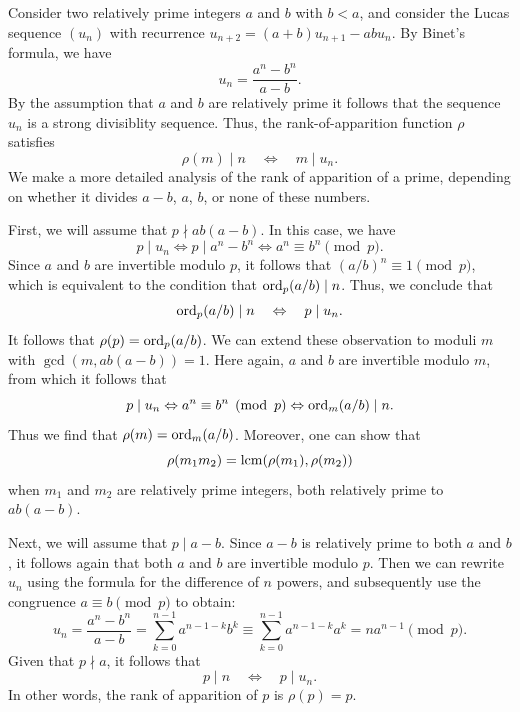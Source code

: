 \begin{example}\label{example:rank-of-apparition-square-discriminant-lucas-sequence}
  Consider two relatively prime integers $a$ and $b$ with $b<a$, and consider the Lucas sequence $(u_n)$ with recurrence $u_{n+2}=(a+b)u_{n+1}-abu_n$. By Binet's formula, we have
  \begin{equation*}
    u_n=\frac{a^n-b^n}{a-b}.
  \end{equation*}
  By the assumption that $a$ and $b$ are relatively prime it follows that the sequence $u_n$ is a strong divisiblity sequence. Thus, the rank-of-apparition function $\rho$ satisfies
  \begin{equation*}
    \rho(m)\mid n\quad\Leftrightarrow\quad m\mid u_n.
  \end{equation*}
  We make a more detailed analysis of the rank of apparition of a prime, depending on whether it divides $a-b$, $a$, $b$, or none of these numbers.

  First, we will assume that $p\nmid ab(a-b)$. In this case, we have
  \begin{equation*}
    p\mid u_n\Leftrightarrow p\mid a^n-b^n\Leftrightarrow a^n\equiv b^n\pmod{p}.
  \end{equation*}
  Since $a$ and $b$ are invertible modulo $p$, it follows that $(a/b)^n\equiv 1\pmod{p}$, which is equivalent to the condition that $\operatorname{ord}_p(a/b)\mid n$. Thus, we conclude that
  \begin{equation*}
    \operatorname{ord}_p(a/b)\mid n \quad\Leftrightarrow\quad p\mid u_n.
  \end{equation*}
  It follows that $\rho(p)=\operatorname{ord}_p(a/b)$. We can extend these observation to moduli $m$ with $\gcd(m,ab(a-b))=1$. Here again, $a$ and $b$ are invertible modulo $m$, from which it follows that
  \begin{equation*}
    p\mid u_n\Leftrightarrow a^n\equiv b^n\mkern5mu\left(\operatorname{mod} \mkern 6mu p\right)\Leftrightarrow \operatorname{ord}_m(a/b)\mid n.
  \end{equation*}
  Thus we find that $\rho(m)=\operatorname{ord}_m(a/b)$. Moreover, one can show that
  \begin{equation*}
    \rho(m_1m_2)=\operatorname*{lcm}(\rho(m_1),\rho(m_2))
  \end{equation*}
  when $m_1$ and $m_2$ are relatively prime integers, both relatively prime to $ab(a-b)$.

  Next, we will assume that $p\mid a-b$. Since $a-b$ is relatively prime to both $a$ and $b$, it follows again that both $a$ and $b$ are invertible modulo $p$. Then we can rewrite $u_n$ using the formula for the difference of $n$\supth{} powers, and subsequently use the congruence $a\equiv b\pmod{p}$ to obtain:
  \begin{equation*}
    u_n=\frac{a^n-b^n}{a-b}=\sum_{k=0}^{n-1} a^{n-1-k}b^k \equiv \sum_{k=0}^{n-1} a^{n-1-k}a^k = na^{n-1}\pmod{p}.
  \end{equation*}
  Given that $p\nmid a$, it follows that
  \begin{equation*}
    p\mid n\quad\Leftrightarrow\quad p\mid u_n.
  \end{equation*}
  In other words, the rank of apparition of $p$ is $\rho(p)=p$.


\end{example}
